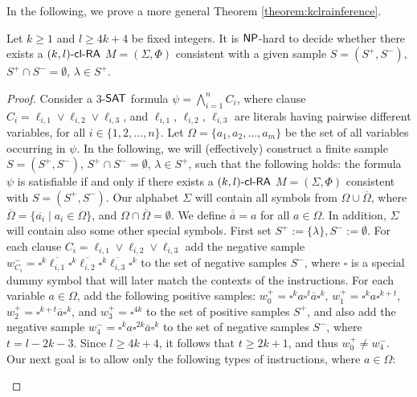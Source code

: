 In the following, we prove a more general Theorem \ref{theorem:kclrainference}.

\begin{theorem}\label{theorem:kclrainference}
Let $k \ge 1 $ and $l \ge 4k + 4$ be fixed integers.
It is $\textup{\sf NP}$-hard to decide whether there exists a $\textup{\sf $(k,l)$-\textup{\sf cl-RA\/}}$ $M = (\Sigma, \Phi)$ consistent with a given sample $S = (S^+, S^-)$, $S^+ \cap S^- = \emptyset$, $\lambda \in S^+$.
\end{theorem}

\begin{proof}
Consider a $3$-$\textup{\sf SAT}$ formula $\psi = \bigwedge_{i=1}^n C_i$, where clause
$C_i = \ell_{i,1} \vee \ell_{i,2} \vee \ell_{i,3}$, and 
$\ell_{i,1}$, $\ell_{i,2}$, $\ell_{i,3}$
are literals having pairwise different variables, for all $i \in \{1, 2, \ldots, n\}$. 
Let $\Omega = \{a_1, a_2, \ldots, a_m\}$ be the set of all variables occurring in $\psi$.
In the following, we will (effectively) construct a finite sample $S = (S^+, S^-)$, 
$S^+ \cap S^- = \emptyset$, $\lambda \in S^+$, such that the following holds: 
the formula $\psi$ is satisfiable if and only if there exists a $\textup{\sf $(k,l)$-\textup{\sf cl-RA\/}}$ 
$M = (\Sigma, \Phi)$ consistent with $S = (S^+, S^-)$.
Our alphabet $\Sigma$ will contain all symbols from $\Omega \cup \overline{\Omega}$, where
$\overline{\Omega} = \{ \overline{a_i} \mid a_i \in \Omega \}$, and
$\Omega \cap \overline{\Omega} = \emptyset$. We define $\overline{\overline{a}} = a$
for all $a \in \Omega$. In addition, $\Sigma$ will contain also some 
other special symbols.
First set $S^+ := \{ \lambda \}, S^- := \emptyset$. For each clause 
$C_i = \ell_{i,1} \vee \ell_{i,2} \vee \ell_{i,3}$ add the negative sample
$w_{C_i}^- = \square^k \overline{\ell_{i,1}} \square^k \overline{\ell_{i,2}} 
\square^k \overline{\ell_{i,3}} \square^k$ to the set of negative samples $S^-$,
where $\square$ is a special dummy symbol that will later match the contexts
of the instructions. For each variable $a \in \Omega$, add the following 
positive samples:
$w_0^+ = \square^k a \square^t \overline{a} \square^k$, 
$w_1^+ = \square^k a \square^{k+t}$, 
$w_2^+ = \square^{k+t} \overline{a} \square^k$, and
$w_3^+ = \square^{4k}$
to the set of positive samples $S^+$,
and also add the negative sample 
$w_4^- = \square^k a \square^{2k}  \overline{a} \square^k$ 
to the set of negative samples $S^-$, where $t = l - 2k - 3$. 
Since $l \ge 4k + 4$, it follows that $t \ge 2k + 1$,
and thus $w_0^+ \neq w_4^-$. Our next goal is to allow 
only the following types of instructions, where $a \in \Omega$:
\begin{enumerate}

\end{enumerate}
\end{proof}
